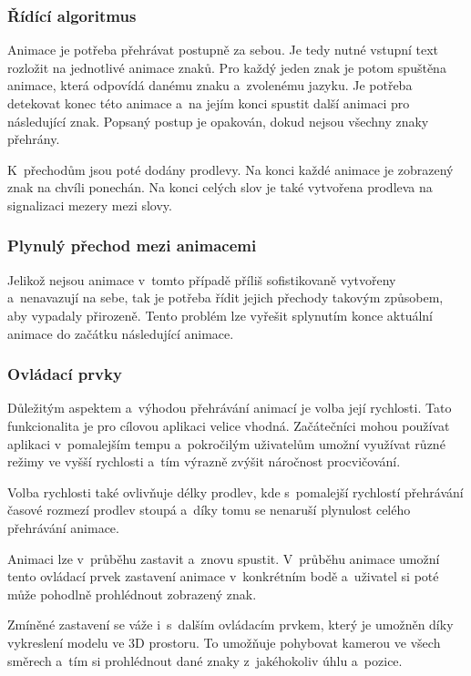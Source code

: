 \documentclass[
  master,
  program=ainfvs,
  biblatex,
  figures=true,
  tables=false,
  sourcecodes=true,
  glossaries,
  index
]{kidiplom}
\begin{document}
        \subsubsection{Řídící algoritmus}
            Animace je potřeba přehrávat postupně za sebou. Je tedy nutné vstupní text rozložit na jednotlivé animace znaků. Pro každý jeden znak je potom spuštěna animace, která odpovídá danému znaku a~zvolenému jazyku. Je potřeba detekovat konec této animace a~na jejím konci spustit další animaci pro následující znak. Popsaný postup je opakován, dokud nejsou všechny znaky přehrány.

           K~přechodům jsou poté dodány prodlevy. Na konci každé animace je zobrazený znak na chvíli ponechán. Na konci celých slov je také vytvořena prodleva na signalizaci mezery mezi slovy.
        
        \subsubsection{Plynulý přechod mezi animacemi}
            Jelikož nejsou animace v~tomto případě příliš sofistikovaně vytvořeny a~nenavazují na sebe, tak je potřeba řídit jejich přechody takovým způsobem, aby vypadaly přirozeně. Tento problém lze vyřešit splynutím konce aktuální animace do začátku následující animace.

        \subsubsection{Ovládací prvky}
            Důležitým aspektem a~výhodou přehrávání animací je volba její rychlosti. Tato funkcionalita je pro cílovou aplikaci velice vhodná. Začátečníci mohou používat aplikaci v~pomalejším tempu a~pokročilým uživatelům umožní využívat různé režimy ve vyšší rychlosti a~tím výrazně zvýšit náročnost procvičování. 
            
            Volba rychlosti také ovlivňuje délky prodlev, kde s~pomalejší rychlostí přehrávání časové rozmezí prodlev stoupá a~díky tomu se nenaruší plynulost celého přehrávání animace.

            Animaci lze v~průběhu zastavit a~znovu spustit. V~průběhu animace umožní tento ovládací prvek zastavení animace v~konkrétním bodě a~uživatel si poté může pohodlně prohlédnout zobrazený znak.

            Zmíněné zastavení se váže i~s~dalším ovládacím prvkem, který je umožněn díky vykreslení modelu ve 3D prostoru. To umožňuje pohybovat kamerou ve všech směrech a~tím si prohlédnout dané znaky z~jakéhokoliv úhlu a~pozice.
\end{document}
